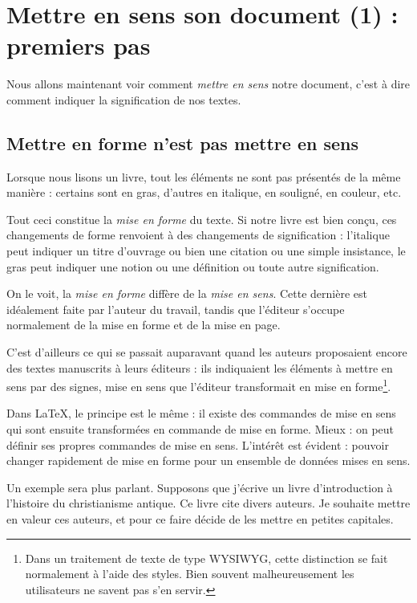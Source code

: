 \chapter{Mettre en sens son document (1) : premiers pas}

\begin{prealable}
	Nous allons maintenant voir comment \emph{mettre en sens} notre document, c'est à dire comment indiquer  la signification de nos textes.
\end{prealable}

\section{Mettre en forme n'est pas mettre en sens}\label{sensforme}

Lorsque nous lisons un livre, tout les éléments ne sont pas présentés de la même manière : certains sont en gras, d'autres en italique, en souligné, en couleur, etc. 

Tout ceci constitue la \emph{mise en forme} du texte. Si notre livre est bien conçu, ces changements de forme renvoient à des changements de signification : l'italique peut indiquer un titre d'ouvrage ou bien une citation ou une simple insistance, le gras peut indiquer une notion ou une définition ou toute autre signification.

On le voit, la \emph{mise en forme} diffère de la \emph{mise en sens}. Cette dernière est idéalement faite par l'auteur du travail, tandis que l'éditeur s'occupe normalement de la mise en forme et de la mise en page.

C'est d'ailleurs ce qui se passait auparavant quand les auteurs proposaient encore des textes manuscrits à leurs éditeurs : ils indiquaient les éléments à mettre en sens par des signes, mise en sens que l'éditeur transformait en mise en forme\footnote{Dans un traitement de texte de type WYSIWYG, cette distinction se fait normalement à l'aide des styles. Bien souvent malheureusement les utilisateurs ne savent pas s'en servir.}.

Dans \LaTeX, le principe est le même : il existe des commandes de mise en sens qui sont ensuite transformées en commande de mise en forme. Mieux : on peut définir ses propres commandes de mise en sens. L'intérêt est  évident : pouvoir changer rapidement de mise en forme pour un ensemble de données mises en sens.

Un exemple sera plus parlant. Supposons que j'écrive un livre d'introduction à l'histoire du christianisme antique. Ce livre cite divers auteurs. Je souhaite mettre en valeur ces auteurs, et pour ce faire décide de les mettre en petites capitales.

